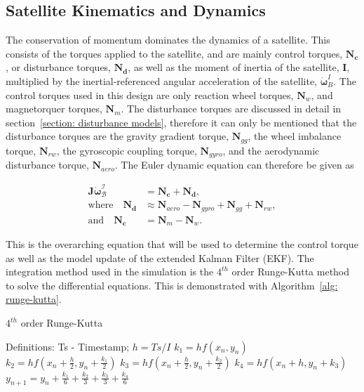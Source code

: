 \subsection{Satellite Kinematics and Dynamics}
The conservation of momentum dominates the dynamics of a satellite. This consists of the torques applied to the satellite, and are mainly control torques, $\mathbf{N_c}$, or disturbance torques, $\mathbf{N_d}$, as well as the moment of inertia of the satellite, $\mathbf{I}$, multiplied by the inertial-referenced angular acceleration of the satellite, $\boldsymbol{\dot{\omega}}_B^I$. The control torques used in this design are only reaction wheel torques, $\mathbf{N}_w$, and magnetorquer torques, $\mathbf{N}_m$. The disturbance torques are discussed in detail in section~\ref{section: disturbance models}, therefore it can only be mentioned that the disturbance torques are the gravity gradient torque, $\mathbf{N}_{gg}$, the wheel imbalance torque, $\mathbf{N}_{rw}$, the gyroscopic coupling torque, $\mathbf{N}_{gyro}$, and the aerodynamic disturbance torque, $\mathbf{N}_{aero}$. The Euler dynamic equation can therefore be given as

\begin{equation}
\begin{aligned}
	\mathbf{J}\boldsymbol{\dot{\omega}}_{\mathcal{B}}^{\mathcal{I}} &= \mathbf{N_c} + \mathbf{N_d}, \\
	\text{where} \quad \mathbf{N_d} &\approx \mathbf{N}_{aero} - \mathbf{N}_{gyro} + \mathbf{N}_{gg} + \mathbf{N}_{rw}, \\
	\text{and} \quad \mathbf{N_c} &= \mathbf{N}_{m} - \mathbf{N}_{w}.
\end{aligned}
\end{equation}

This is the overarching equation that will be used to determine the control torque as well as the model update of the extended Kalman Filter (EKF). The integration method used in the simulation is the $4^{th}$ order Runge-Kutta method to solve the differential equations. This is demonstrated with Algorithm~\ref{alg: runge-kutta}.

\begin{algorithm}[!htb]
	\caption[$4^{th}$ order Runge-Kutta]{$4^{th}$ order Runge-Kutta}
	\label{alg: runge-kutta}
	\begin{algorithmic}[1]
		\State Definitions: Ts - Timestamp; 
		\State $h = Ts/I$ 
		\State	$k_1 = hf(x_n, y_n)$
		\State	$k_2 = hf(x_n + \frac{h}{2}, y_n + \frac{k_1}{2})$
		\State	$k_3 = hf(x_n + \frac{h}{2}, y_n + \frac{k_2}{2})$
		\State	$k_4 = hf(x_n + h, y_n + k_3)$
		\State	$y_{n+1}=y_n + \frac{k_1}{6} + \frac{k_2}{3} + \frac{k_3}{3} + \frac{k_4}{6}$
		\EndFor

	\end{algorithmic}
\end{algorithm}

